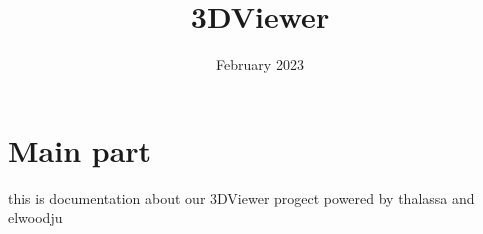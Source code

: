 \documentclass{article}
\title{3DViewer}
\date{February 2023}
\begin{document}
\maketitle

\section{Main part}
this is documentation about our 3DViewer progect 
\newline
powered by thalassa and elwoodju
\end{document}
